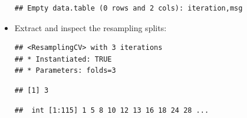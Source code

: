 \documentclass[
]{scrbook}
\newenvironment{Shaded}{\begin{snugshade}}{\end{snugshade}}
\newcommand{\DecValTok}[1]{\textcolor[rgb]{0.00,0.00,0.81}{#1}}
\newcommand{\FunctionTok}[1]{\textcolor[rgb]{0.00,0.00,0.00}{#1}}
\newcommand{\NormalTok}[1]{#1}
\newcommand{\SpecialCharTok}[1]{\textcolor[rgb]{0.00,0.00,0.00}{#1}}
\renewenvironment{Shaded} {\begin{snugshade}\small} {\end{snugshade}}
\begin{document}
\begin{itemize}
\begin{Shaded}
\end{Shaded}

\begin{verbatim}
## Empty data.table (0 rows and 2 cols): iteration,msg
\end{verbatim}
\item
  Extract and inspect the resampling splits:

\begin{Shaded}
\end{Shaded}

\begin{verbatim}
## <ResamplingCV> with 3 iterations
## * Instantiated: TRUE
## * Parameters: folds=3
\end{verbatim}

\begin{Shaded}
\end{Shaded}

\begin{verbatim}
## [1] 3
\end{verbatim}

\begin{Shaded}
\end{Shaded}

\begin{verbatim}
##  int [1:115] 1 5 8 10 12 13 16 18 24 28 ...
\end{verbatim}

\begin{Shaded}
\end{Shaded}


\end{itemize}
\end{document}
